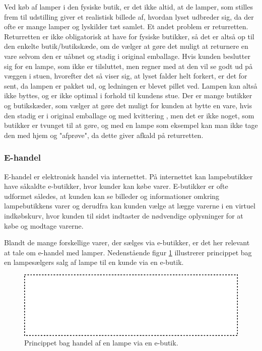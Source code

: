 \label{sec:sammenligning_af_e_og_d}
Ved køb af lamper i den fysiske butik, er det ikke altid, at de lamper, som stilles frem til udstilling giver et realistisk billede af, hvordan lyset udbreder sig, da der ofte er mange lamper og lyskilder tæt samlet. Et andet problem er returretten. Returretten er ikke obligatorisk at have for fysiske butikker, så det er altså op til den enkelte butik/butikskæde, om de vælger at gøre det muligt at returnere en vare selvom den er uåbnet og stadig i original emballage\cite{fortrydelsesret}. Hvis kunden beslutter sig for en lampe, som ikke er tilsluttet, men regner med at den vil se godt ud på væggen i stuen, hvorefter det så viser sig, at lyset falder helt forkert, er det for sent, da lampen er pakket ud, og ledningen er blevet pillet ved. Lampen kan altså ikke byttes, og er ikke optimal i forhold til kundens stue. Der er mange butikker og butikskæder, som vælger at gøre det muligt for kunden at bytte en vare, hvis den stadig er i original emballage og med kvittering \cite{ikea_returret}, men det er ikke noget, som butikker er tvunget til at gøre, og med en lampe som eksempel kan man ikke tage den med hjem og "afprøve", da dette giver afkald på returretten.

\subsubsection{E-handel}
\label{sec:ehandel}
E-handel er elektronisk handel via internettet\cite{ddo_ehandel}. På internettet kan lampebutikker have såkaldte e-butikker, hvor kunder kan købe varer\cite{ddo_ebutik}. E-butikker er ofte udformet således, at kunden kan se billeder og informationer omkring lampebutikkens varer og derudfra kan kunden vælge at lægge varerne i en virtuel indkøbskurv, hvor kunden til sidst indtaster de nødvendige oplysninger for at købe og modtage varerne.

Blandt de mange forskellige varer, der sælges via e-butikker, er det her relevant at tale om e-handel med lamper. Nedenstående figur \ref{fig:e_handel_med_lamper} illustrerer princippet bag en lampesælgers salg af lampe til en kunde via en e-butik.

\begin{figure}[H]
	\includegraphics{e_handel_med_lampe.pdf}
	\caption{Princippet bag handel af en lampe via en e-butik.}
    \label{fig:e_handel_med_lamper}
\end{figure}

